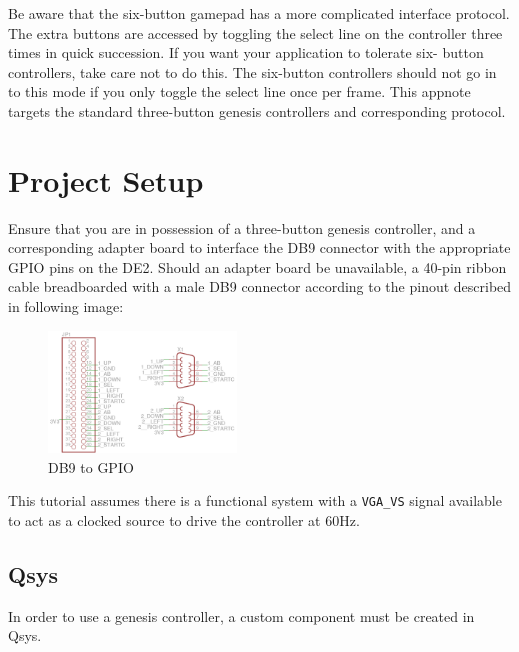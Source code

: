 \documentclass{capstonedoc}
\begin{document}
Be aware that the six-button gamepad has a more complicated interface protocol.
The extra buttons are accessed by toggling the select line on the controller
three times in quick succession. If you want your application to tolerate six-
button controllers, take care not to do this. The six-button controllers should
not go in to this mode if you only toggle the select line once per frame.
This appnote targets the standard three-button genesis controllers and 
corresponding protocol.

\section{Project Setup}
Ensure that you are in possession of a three-button genesis controller, and a 
corresponding adapter board to interface the DB9 connector with the appropriate 
GPIO pins on the DE2. Should an adapter board be unavailable, a 40-pin ribbon 
cable breadboarded with a male DB9 connector according to the pinout described 
in following image: 

\begin{figure}
  \includegraphics[width=5cm]{schematic}
  \caption{DB9 to GPIO}
  \label{fig:schematic}
\end{figure}

This tutorial assumes there is a functional system with a \texttt{VGA\_VS}
signal available to act as a clocked source to drive the controller at 60Hz. 

\subsection{Qsys}

In order to use a genesis controller, a custom component must be created in Qsys.
\end{document}
